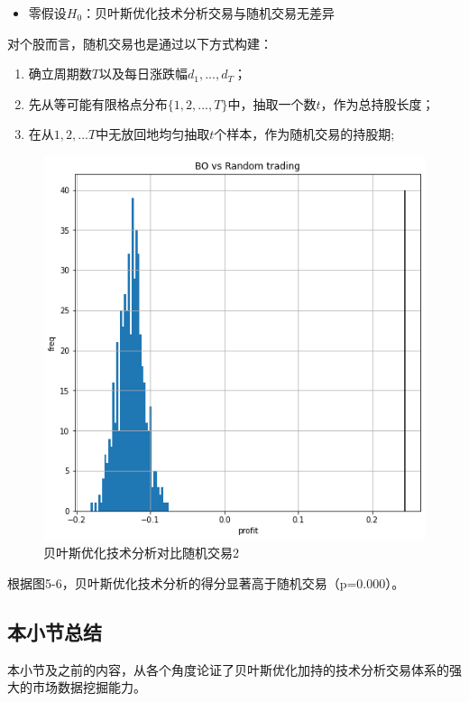 \documentclass[twoside,longtitle]{LZUthesis}
\begin{document}
\begin{itemize}
    \item 零假设$H_0$：贝叶斯优化技术分析交易与随机交易无差异
\end{itemize}

对个股而言，随机交易也是通过以下方式构建：
\begin{enumerate}
    \item 确立周期数$T$以及每日涨跌幅$d_1,...,d_T$；
    \item 先从等可能有限格点分布$\{1,2,...,T\}$中，抽取一个数$t$，作为总持股长度；
    \item 在从${1,2,...T}$中无放回地均匀抽取$t$个样本，作为随机交易的持股期;
\end{enumerate}

\begin{figure}[h]
    \centering
    \includegraphics[scale=0.7]{fig5-6.png}
    \caption{贝叶斯优化技术分析对比随机交易2}
    \label{fig:my_label}
\end{figure}

根据图5-6，贝叶斯优化技术分析的得分显著高于随机交易（p=0.000）。

\subsection{本小节总结}
本小节及之前的内容，从各个角度论证了贝叶斯优化加持的技术分析交易体系的强大的市场数据挖掘能力。
\end{document}
